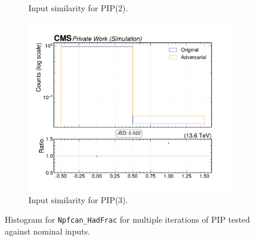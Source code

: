 \begin{figure}[htbp]
\begin{subfigure}[t]{0.32\textwidth}
    \caption{Input similarity for PIP(2).}
  \end{subfigure}\hfill
  \begin{subfigure}[t]{0.32\textwidth}
    \includegraphics[width=\linewidth]{media/output/features/compare/intprob_3/cmp_npf_arr_Npfcan_HadFrac.pdf}
    \caption{Input similarity for PIP(3).}
  \end{subfigure}

  \caption{Histogram for \texttt{Npfcan\_HadFrac} for multiple iterations of PIP tested against nominal inputs.}
  \label{fig:intprob_input_Npfcan_HadFrac}
\end{figure}

